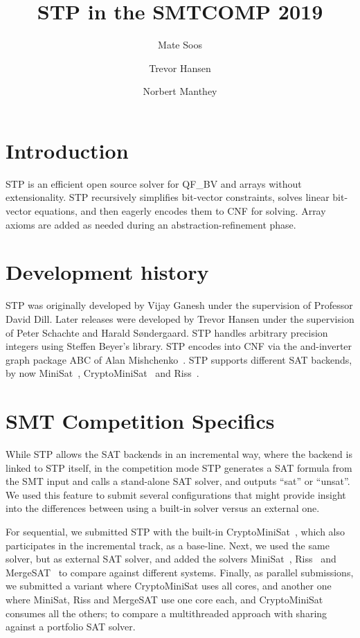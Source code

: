 \documentclass{llncs}
\begin{document}
\title{STP in the SMTCOMP 2019}
\author{Mate Soos \and Trevor Hansen \and Norbert Manthey}

\maketitle
\thispagestyle{empty}
\pagestyle{empty}

\section{Introduction}
STP\cite{Vijay:Thesis:2007} is an efficient open source solver for QF\_BV and arrays without extensionality. STP recursively simplifies bit-vector constraints, solves linear bit-vector equations, and then eagerly encodes them to CNF for solving. Array axioms are added as needed during an abstraction-refinement phase.

\section{Development history}
STP was originally developed by Vijay Ganesh under the supervision of Professor David Dill. Later releases were developed by Trevor Hansen under the supervision of Peter Schachte and Harald Søndergaard. STP handles arbitrary precision integers using Steffen Beyer's library. STP encodes into CNF via the and-inverter graph package ABC of Alan Mishchenko~\cite{Brayton:2010:AAI:2144310.2144317}.
STP supports different SAT backends, by now MiniSat~\cite{MiniSat:github}, CryptoMiniSat~\cite{CMS:github} and Riss~\cite{Riss:github}.

\section{SMT Competition Specifics}

While STP allows the SAT backends in an incremental way, where the backend is linked to STP itself, in the competition mode STP generates a SAT formula from the SMT input and calls a stand-alone SAT solver, and outputs ``sat'' or ``unsat''.
We used this feature to submit several configurations that might provide insight into the differences between using a built-in solver versus an external one.

For sequential, we submitted STP with the built-in CryptoMiniSat~\cite{CMS:github}, which also participates in the incremental track, as a base-line.
Next, we used the same solver, but as external SAT solver, and added the solvers MiniSat~\cite{MiniSat:github}, Riss~\cite{Riss:github} and MergeSAT~\cite{MergeSAT:github} to compare against different systems.
Finally, as parallel submissions, we submitted a variant where CryptoMiniSat uses all cores, and another one where MiniSat, Riss and MergeSAT use one core each, and CryptoMiniSat consumes all the others; to compare a multithreaded approach with sharing against a portfolio SAT solver.
\end{document}
